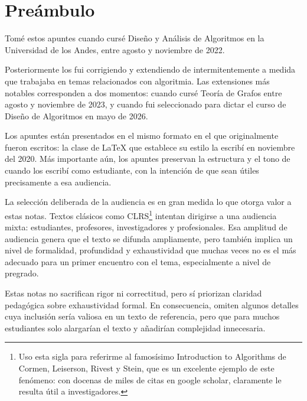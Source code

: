 \part*{Preámbulo}

Tomé estos apuntes cuando cursé Diseño y Análisis de Algoritmos en la Universidad de los Andes, entre agosto y noviembre de 2022. 

Posteriormente los fui corrigiendo y extendiendo de intermitentemente a medida que trabajaba en temas relacionados con algoritmia. Las extensiones más notables corresponden a dos momentos: cuando cursé Teoría de Grafos entre agosto y noviembre de 2023, y cuando fui seleccionado para dictar el curso de Diseño de Algoritmos en mayo de 2026.

Los apuntes están presentados en el mismo formato en el que originalmente fueron escritos: la clase de \LaTeX{} que establece su estilo la escribí en noviembre del 2020. Más importante aún, los apuntes preservan la estructura y el tono de cuando los escribí como estudiante, con la intención de que sean útiles precisamente a esa audiencia.

La selección deliberada de la audiencia es en gran medida lo que otorga valor a estas notas. Textos clásicos como CLRS\footnote{Uso esta sigla para referirme al famosísimo Introduction to Algorithms de Cormen, Leiserson, Rivest y Stein, que es un excelente ejemplo de este fenómeno: con docenas de miles de citas en google scholar, claramente le resulta útil a investigadores.} intentan dirigirse a una audiencia mixta: estudiantes, profesores, investigadores y profesionales. Esa amplitud de audiencia genera que el texto se difunda ampliamente, pero también implica un nivel de formalidad, profundidad y exhaustividad que muchas veces no es el más adecuado para un primer encuentro con el tema, especialmente a nivel de pregrado.

Estas notas no sacrifican rigor ni correctitud, pero sí priorizan claridad pedagógica sobre exhaustividad formal. En consecuencia, omiten algunos detalles cuya inclusión sería valiosa en un texto de referencia, pero que para muchos estudiantes solo alargarían el texto y añadirían complejidad innecesaria.
